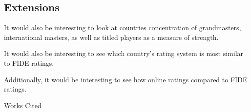 \documentclass[12pt]{article}
\begin{document}
\subsection{Extensions}
It would also be interesting to look at countries concentration of grandmasters, international masters, as well as titled players as a measure of strength. 

It would also be interesting to see which country's rating system is most similar to FIDE ratings.

Additionally, it would be interesting to see how online ratings compared to FIDE ratings.

\newpage
\begin{center}
Works Cited
\end{center}
\end{document}
